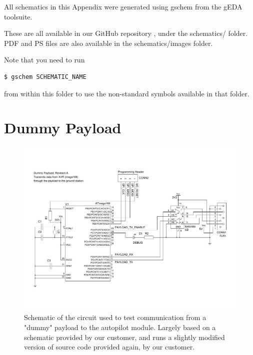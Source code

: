 All schematics in this Appendix were generated using gschem from the gEDA 
toolsuite.

These are all available in our GitHub repository \cite{github}, under the 
schematics/ folder. PDF and PS files are also available in the 
schematics/images folder.

Note that you need to run 
\begin{verbatim} 
$ gschem SCHEMATIC_NAME
\end{verbatim}
from within this folder to use the non-standard symbols available in that 
folder.

\section{Dummy Payload}
\begin{figure}[H]
\includegraphics[width=1.4\textwidth, angle=90]{schematics/dummy_payload.pdf}
\caption{Schematic of the circuit used to test communication from a "dummy" 
payload to the autopilot module. Largely based on a schematic provided by 
our customer, and runs a slightly modified version of source code provided 
again, by our customer.}
\end{figure}

